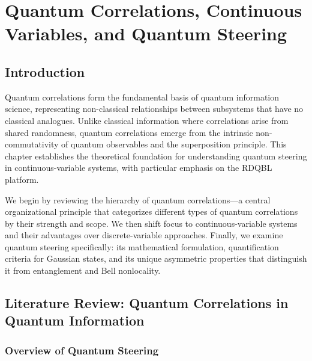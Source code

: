 
\chapter{Quantum Correlations, Continuous Variables, and Quantum Steering}
\label{chp2}
\newpage

\section{Introduction}

Quantum correlations form the fundamental basis of quantum information science, representing non-classical relationships between subsystems that have no classical analogues. Unlike classical information where correlations arise from shared randomness, quantum correlations emerge from the intrinsic non-commutativity of quantum observables and the superposition principle. This chapter establishes the theoretical foundation for understanding quantum steering in continuous-variable systems, with particular emphasis on the RDQBL platform.

We begin by reviewing the hierarchy of quantum correlations—a central organizational principle that categorizes different types of quantum correlations by their strength and scope. We then shift focus to continuous-variable systems and their advantages over discrete-variable approaches. Finally, we examine quantum steering specifically: its mathematical formulation, quantification criteria for Gaussian states, and its unique asymmetric properties that distinguish it from entanglement and Bell nonlocality.

\section{Literature Review: Quantum Correlations in Quantum Information}

\subsection{Overview of Quantum Steering}

